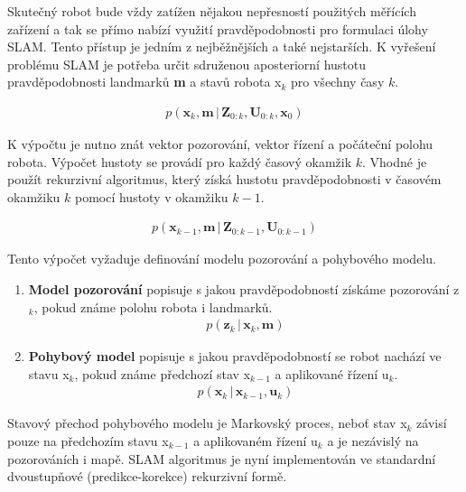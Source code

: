 \documentclass[12pt,a4paper]{article}
\begin{document}
Skutečný robot bude vždy zatížen nějakou nepřesností použitých měřících zařízení a tak se přímo nabízí využití pravděpodobnosti pro formulaci úlohy SLAM. Tento přístup je jedním z nejběžnějších a také nejstarších. K vyřešení problému SLAM je potřeba určit sdruženou aposteriorní hustotu pravděpodobnosti landmarků \textbf{m} a stavů robota x$_k$ pro všechny časy $k$.

\begin{eqnarray}
p(\textbf{x}_k, \textbf{m} \,|\, \textbf{Z}_{0:k}, \textbf{U}_{0:k}, \textbf{x}_0)
\end{eqnarray}

K výpočtu je nutno znát vektor pozorování, vektor řízení a počáteční polohu robota. Výpočet hustoty se provádí pro každý časový okamžik $k$. Vhodné je použít rekurzivní algoritmus, který získá hustotu pravděpodobnosti v časovém okamžiku $k$ pomocí hustoty v okamžiku $k-1$.

\begin{eqnarray}
p(\textbf{x}_{k-1}, \textbf{m} \,|\, \textbf{Z}_{0:k-1}, \textbf{U}_{0:k-1})
\end{eqnarray}

Tento výpočet vyžaduje definování modelu pozorování a pohybového modelu.

\begin{enumerate}
\item \textbf{Model pozorování} popisuje s jakou pravděpodobností získáme pozorování z$_k$, pokud známe polohu robota i landmarků.
\begin{eqnarray}
p(\textbf{z}_k \,|\, \textbf{x}_k, \textbf{m})
\end{eqnarray}
\item \textbf{Pohybový model} popisuje s jakou pravděpodobností se robot nachází ve stavu x$_k$, pokud známe předchozí stav x$_{k-1}$ a aplikované řízení u$_k$.
\begin{eqnarray}
p(\textbf{x}_k \,|\, \textbf{x}_{k-1}, \textbf{u}_k)
\end{eqnarray}
\end{enumerate}

Stavový přechod pohybového modelu je Markovský proces, neboť stav x$_k$ závisí pouze na předchozím stavu x$_{k-1}$ a aplikovaném řízení u$_k$ a je nezávislý na pozorováních i mapě. SLAM algoritmus je nyní implementován ve standardní dvoustupňové (predikce-korekce) rekurzivní formě.

\newpage
\end{document}
